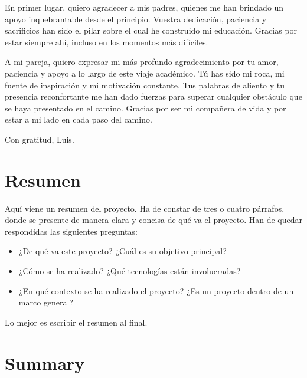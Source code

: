 \documentclass[a4paper, 12pt]{book}
\begin{document}
	En primer lugar, quiero agradecer a mis padres, quienes me han brindado un apoyo inquebrantable desde el principio. Vuestra dedicación, paciencia y sacrificios han sido el pilar sobre el cual he construido mi educación. Gracias por estar siempre ahí, incluso en los momentos más difíciles.
		
	A mi pareja, quiero expresar mi más profundo agradecimiento por tu amor, paciencia y apoyo a lo largo de este viaje académico. Tú has sido mi roca, mi fuente de inspiración y mi motivación constante. Tus palabras de aliento y tu presencia reconfortante me han dado fuerzas para superar cualquier obstáculo que se haya presentado en el camino. Gracias por ser mi compañera de vida y por estar a mi lado en cada paso del camino.
	
	Con gratitud,
	Luis.
	
	
	\chapter*{Resumen}
	
	Aquí viene un resumen del proyecto.
	Ha de constar de tres o cuatro párrafos, donde se presente de manera clara y concisa de qué va el proyecto. 
	Han de quedar respondidas las siguientes preguntas:
	
	\begin{itemize}
		\item ¿De qué va este proyecto? ¿Cuál es su objetivo principal?
		\item ¿Cómo se ha realizado? ¿Qué tecnologías están involucradas?
		\item ¿En qué contexto se ha realizado el proyecto? ¿Es un proyecto dentro de un marco general?
	\end{itemize}
	
	Lo mejor es escribir el resumen al final.
	
	
	\chapter*{Summary}
	
\end{document}
